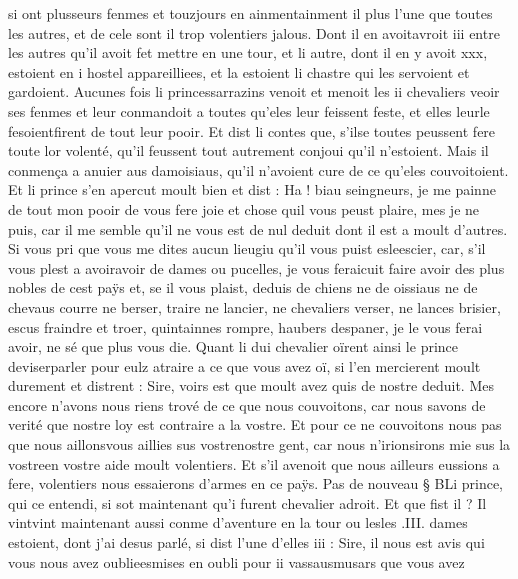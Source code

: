 \documentclass{article}
\begin{document}
\begin{pages}
   si ont plusseurs fenmes et touzjours en ainmentainment il plus l’une 
   que toutes les autres, et de cele sont il trop volentiers jalous. 
   Dont il en avoitavroit
   iii entre les autres qu’il avoit fet mettre en une tour, et li autre, dont il en y avoit xxx, estoient en 
   i hostel appareilliees, et la estoient li chastre qui les servoient 
   et gardoient. Aucunes fois 
   li princessarrazins 
   venoit et menoit les ii chevaliers veoir ses fenmes et leur 
   conmandoit a toutes qu’eles leur feissent 
      feste, et elles leurle 
   fesoientfirent de tout leur pooir.
   Et dist li contes que, s’ilse toutes peussent fere 
   toute lor volenté, qu’il feussent tout autrement conjoui qu’il n’estoient. Mais il conmença a anuier aus damoisiaus, qu’il n’avoient 
   cure de ce qu’eles couvoitoient. Et li prince s’en apercut moult bien et dist :
   Ha ! biau seingneurs, je me painne de tout mon 
      pooir de vous fere joie et chose quil vous peust plaire, mes je ne puis, 
      car il me semble qu’il ne vous est de nul deduit dont il est a moult d’autres. 
      Si vous pri que vous me dites aucun lieugiu qu’il vous puist esleescier, 
      car, s’il vous plest a avoiravoir de dames ou pucelles, je vous feraicuit faire 
      avoir des plus nobles de cest paÿs et, se il vous plaist, deduis de chiens ne de oissiaus ne de chevaus courre ne berser, traire 
      ne lancier, ne chevaliers verser, ne lances brisier, escus fraindre et troer, quintainnes rompre, haubers despaner, 
      je le vous ferai avoir, ne sé que plus vous die. \pend
 \pstart Quant li dui chevalier oïrent ainsi 
    le prince deviserparler pour eulz 
    atraire a ce que vous avez oï, si l’en mercierent moult 
    durement et distrent :
    Sire, voirs est que moult avez quis de nostre deduit. Mes encore n’avons nous riens trové de ce que 
      nous couvoitons, car nous savons de verité que nostre loy est contraire a la vostre. Et pour ce ne couvoitons nous pas que 
      nous aillonsvous aillies sus 
      vostrenostre gent, 
      car nous n’irionsirons mie 
      sus la vostreen vostre aide moult volentiers. 
      Et s’il avenoit que nous ailleurs eussions a fere, volentiers nous essaierons d’armes en ce paÿs. \pend
\pstart Pas de nouveau § BLi prince, 
   qui ce entendi, si sot maintenant qu’i furent chevalier adroit. Et que fist il ? Il 
   vintvint maintenant aussi conme d’aventure en 
   la tour ou lesles .III. dames 
      estoient, dont j’ai desus parlé, si dist l’une d’elles 
   iii :
   Sire, il nous est avis qui vous nous avez 
      oublieesmises en oubli pour ii 
      vassausmusars que vous avez 

\end{pages}
\end{document}

